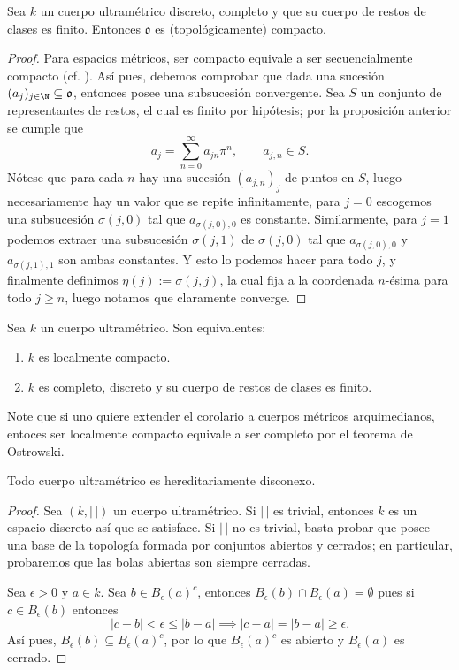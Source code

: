 \documentclass[teoria-numeros.tex]{subfiles}
\begin{document}
\begin{thm}
	Sea $k$ un cuerpo ultramétrico discreto, completo y que su cuerpo de restos de clases es finito.
	Entonces $\mathfrak{o}$ es (topológicamente) compacto.
\end{thm}
\begin{proof}
	Para espacios métricos, ser compacto equivale a ser secuencialmente compacto (cf. \cite[Teo.~3.55]{Top}).
	Así pues, debemos comprobar que dada una sucesión $(a_j)_{j\in\N} \subseteq \mathfrak{o}$, entonces posee una subsucesión convergente.
	Sea $S$ un conjunto de representantes de restos, el cual es finito por hipótesis; por la proposición anterior se cumple que
	$$ a_j = \sum_{n=0}^{\infty} a_{jn} \pi^n, \qquad a_{j,n} \in S. $$
	Nótese que para cada $n$ hay una sucesión $(a_{j,n})_j$ de puntos en $S$, luego necesariamente hay un valor que se repite infinitamente,
	para $j = 0$ escogemos una subsucesión $\sigma(j, 0)$ tal que $a_{\sigma(j, 0), 0}$ es constante.
	Similarmente, para $j = 1$ podemos extraer una subsucesión $\sigma(j, 1)$ de $\sigma(j, 0)$ tal que $a_{\sigma(j, 0), 0}$ y $a_{\sigma(j, 1), 1}$ son
	ambas constantes.
	Y esto lo podemos hacer para todo $j$, y finalmente definimos $\eta(j) := \sigma(j, j)$, la cual fija a la coordenada $n$-ésima para todo $j \ge n$,
	luego notamos que claramente converge.
\end{proof}

\begin{cor}
	Sea $k$ un cuerpo ultramétrico. Son equivalentes:
	\begin{enumerate}
		\item $k$ es localmente compacto.
		\item $k$ es completo, discreto y su cuerpo de restos de clases es finito.
	\end{enumerate}
\end{cor}
Note que si uno quiere extender el corolario a cuerpos métricos arquimedianos, entoces ser localmente compacto equivale a ser completo por el teorema de Ostrowski.

\begin{thm}
	Todo cuerpo ultramétrico es hereditariamente disconexo.
\end{thm}
\begin{proof}
	Sea $(k, |\,|)$ un cuerpo ultramétrico.
	Si $|\,|$ es trivial, entonces $k$ es un espacio discreto así que se satisface.
	Si $|\,|$ no es trivial, basta probar que posee una base de la topología formada por conjuntos abiertos y cerrados;
	en particular, probaremos que las bolas abiertas son siempre cerradas.

	Sea $\epsilon > 0$ y $a \in k$.
	Sea $b \in B_\epsilon(a)^c$, entonces $B_\epsilon(b) \cap B_\epsilon(a) = \emptyset$ pues si $c \in B_\epsilon(b)$ entonces
	$$ |c - b| < \epsilon \le |b - a| \implies |c - a| = |b - a| \ge \epsilon. $$
	Así pues, $B_\epsilon(b) \subseteq B_\epsilon(a)^c$, por lo que $B_\epsilon(a)^c$ es abierto y $B_\epsilon(a)$ es cerrado.
\end{proof}
\end{document}

